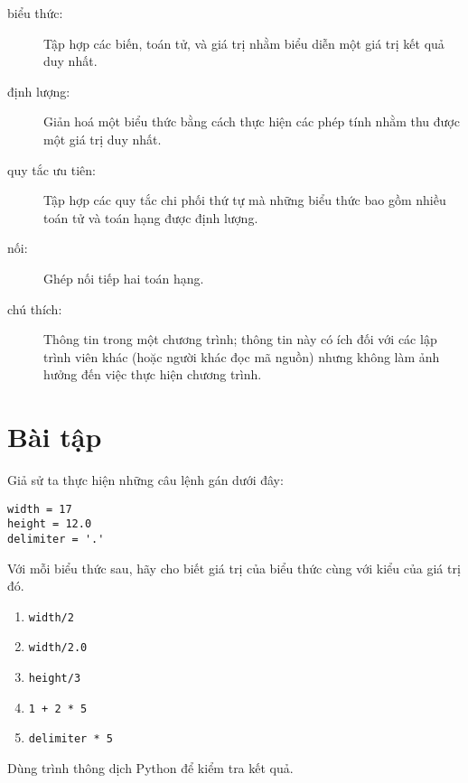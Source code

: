 \documentclass[11pt]{book}
\begin{document}
\begin{description}
\item[biểu thức:]  Tập hợp các biến, toán tử, và giá trị nhằm biểu
diễn một giá trị kết quả duy nhất.

\item[định lượng:]  Giản hoá một biểu thức bằng cách thực hiện các
phép tính nhằm thu được một giá trị duy nhất.

\item[quy tắc ưu tiên:]  Tập hợp các quy tắc chi phối thứ tự mà những
biểu thức bao gồm nhiều toán tử và toán hạng được định lượng.

\item[nối:]  Ghép nối tiếp hai toán hạng.

\item[chú thích:]  Thông tin trong một chương trình; thông tin này
có ích đối với các lập trình viên khác (hoặc người khác đọc mã nguồn)
nhưng không làm ảnh hưởng đến việc thực hiện chương trình.

\end{description}


\section{Bài tập}

\begin{ex}
Giả sử ta thực hiện những câu lệnh gán dưới đây:

\begin{verbatim}
width = 17
height = 12.0
delimiter = '.'
\end{verbatim}

Với mỗi biểu thức sau, hãy cho biết giá trị của biểu thức
cùng với kiểu của giá trị đó.

\begin{enumerate}

\item {\tt width/2}

\item {\tt width/2.0}

\item {\tt height/3}

\item {\tt 1 + 2 * 5}

\item {\tt delimiter * 5}

\end{enumerate}

Dùng trình thông dịch Python để kiểm tra kết quả.
\end{ex}
\end{document}
